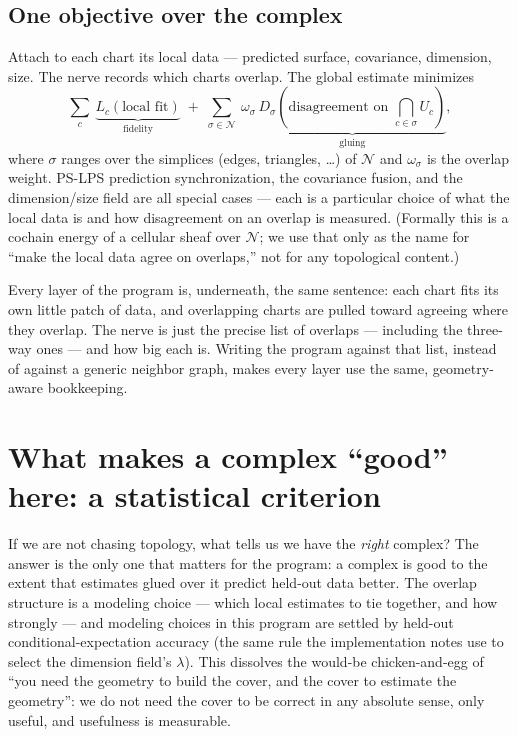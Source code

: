 \documentclass[11pt]{article}
\theoremstyle{definition}
\newcommand{\nerve}{\mathcal{N}}
\begin{document}
\subsection{One objective over the complex}
Attach to each chart its local data --- predicted surface, covariance, dimension,
size. The nerve records which charts overlap. The global estimate minimizes
\[
  \sum_{c}\ \underbrace{L_c(\text{local fit})}_{\text{fidelity}}
  \;+\;\sum_{\sigma\in\nerve}\ \omega_\sigma\,
  \underbrace{D_\sigma(\text{disagreement on }{\textstyle\bigcap_{c\in\sigma}U_c})}_{\text{gluing}},
\]
where $\sigma$ ranges over the simplices (edges, triangles, \dots) of $\nerve$ and
$\omega_\sigma$ is the overlap weight. PS-LPS prediction synchronization, the
covariance fusion, and the dimension/size field are all special cases --- each is
a particular choice of what the local data is and how disagreement on an overlap
is measured. (Formally this is a cochain energy of a cellular sheaf over $\nerve$;
we use that only as the name for ``make the local data agree on overlaps,'' not for
any topological content.)

\begin{plain}
Every layer of the program is, underneath, the same sentence: each chart fits its
own little patch of data, and overlapping charts are pulled toward agreeing where
they overlap. The nerve is just the precise list of overlaps --- including the
three-way ones --- and how big each is. Writing the program against that list,
instead of against a generic neighbor graph, makes every layer use the same,
geometry-aware bookkeeping.
\end{plain}

\section{What makes a complex ``good'' here: a statistical criterion}\label{sec:criterion}

If we are not chasing topology, what tells us we have the \emph{right} complex?
The answer is the only one that matters for the program: a complex is good to the
extent that estimates glued over it predict held-out data better. The overlap
structure is a modeling choice --- which local estimates to tie together, and how
strongly --- and modeling choices in this program are settled by held-out
conditional-expectation accuracy (the same rule the implementation notes use to
select the dimension field's $\lambda$). This dissolves the would-be
chicken-and-egg of ``you need the geometry to build the cover, and the cover to
estimate the geometry'': we do not need the cover to be correct in any absolute
sense, only useful, and usefulness is measurable.
\end{document}
